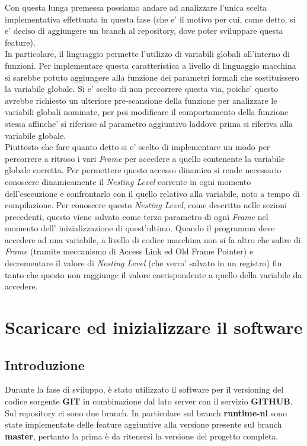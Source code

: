 \documentclass{article}
\begin{document}
Con questa lunga premessa possiamo andare ad analizzare l'unica scelta implementativa effettuata in questa fase (che e' il motivo per cui, come detto, si e' deciso di aggiungere un branch al repository, dove poter sviluppare questa feature).\\
In particolare, il linguaggio permette l'utilizzo di variabili globali all'interno di funzioni. Per implementare questa caratteristica a livello di linguaggio macchina si sarebbe potuto aggiungere alla funzione dei parametri formali che sostituissero la variabile globale. Si e' scelto di non percorrere questa via, poiche' questo avrebbe richiesto un ulteriore pre-scansione della funzione per analizzare le variabili globali nominate, per poi modificare il comportamento della funzione stessa affinche' si riferisse al parametro aggiuntivo laddove prima si riferiva alla variabile globale. \\
Piuttosto che fare quanto detto si e' scelto di implementare un modo per percorrere a ritroso i vari \textit{Frame} per accedere a quello contenente la variabile globale corretta. Per permettere questo accesso dinamico si rende necessario conoscere dinamicamente il \textit{Nesting Level} corrente in ogni momento dell'esecuzione e confrontarlo con il quello relativo alla variabile, noto a tempo di compilazione. Per conoscere questo \textit{Nesting Level}, come descritto nelle sezioni precedenti, questo viene salvato come terzo parametro di ogni \textit{Frame} nel momento dell' inizializzazione di quest'ultimo. Quando il programma deve accedere ad una variabile, a livello di codice macchina non si fa altro che salire di \textit{Frame} (tramite meccanismo di Access Link ed Old Frame Pointer) e decrementare il valore di \textit{Nesting Level} (che verra' salvato in un registro) fin tanto che questo non raggiunge il valore corrispondente a quello della variabile da accedere.

\newpage
\section{Scaricare ed inizializzare il software}

\subsection{Introduzione}

Durante la fase di sviluppo, è stato utilizzato il software per il versioning del codice sorgente \textbf{GIT} in combinazione dal lato server con il servizio \textbf{GITHUB}. Sul repository ci sono due branch. In particolare sul branch \textbf{runtime-nl} sono state implementate delle feature aggiuntive alla versione presente sul branch \textbf{master}, pertanto la prima è da ritenersi la versione del progetto completa.
\end{document}
